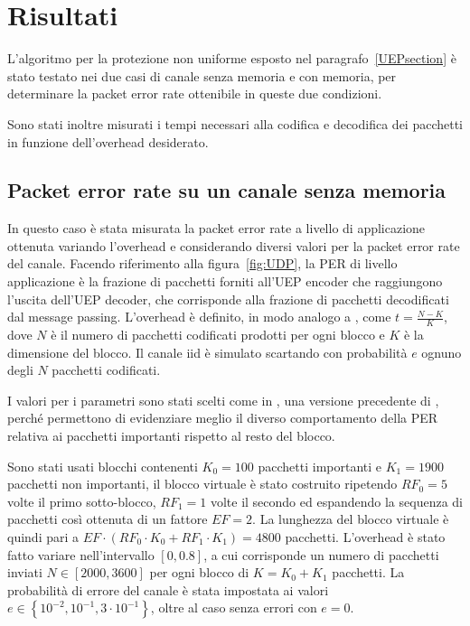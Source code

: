 \documentclass[italian, a4paper, 12pt]{article}
\begin{document}
\section{Risultati} %
\label{sec:results}
L'algoritmo per la protezione non uniforme esposto nel
paragrafo~\ref{UEPsection} è stato testato nei due casi di canale
senza memoria e con memoria, per determinare la packet error
rate ottenibile in queste due condizioni.

Sono stati inoltre misurati i tempi necessari alla codifica e
decodifica dei pacchetti in funzione dell'overhead desiderato.

\subsection{Packet error rate su un canale senza memoria}
\label{sec:iid}
In questo caso è stata misurata la packet error rate a livello di
applicazione ottenuta variando l'overhead e considerando diversi
valori per la packet error rate del canale.
%
Facendo riferimento alla figura~\ref{fig:UDP}, la PER di livello
applicazione è la frazione di pacchetti forniti all'UEP encoder che
raggiungono l'uscita dell'UEP decoder, che corrisponde alla frazione
di pacchetti decodificati dal message passing.
%
L'overhead è definito, in modo analogo a \cite{uep}, come $t =
\frac{N-K}{K}$, dove $N$ è il numero di pacchetti codificati prodotti
per ogni blocco e $K$ è la dimensione del blocco.
%
Il canale iid è simulato scartando con probabilità $e$ ognuno degli
$N$ pacchetti codificati.

I valori per i parametri sono stati scelti come in \cite{uepother},
una versione precedente di \cite{uep}, perché permettono di
evidenziare meglio il diverso comportamento della PER relativa ai
pacchetti importanti rispetto al resto del blocco.

Sono stati usati blocchi contenenti $K_0 = 100$ pacchetti importanti e
$K_1 = 1900$ pacchetti non importanti, il blocco virtuale è stato
costruito ripetendo $RF_0 = 5$ volte il primo sotto-blocco, $RF_1 = 1$
volte il secondo ed espandendo la sequenza di pacchetti così ottenuta
di un fattore $EF = 2$. La lunghezza del blocco virtuale è quindi pari
a $EF \cdot \left( RF_0 \cdot K_0 + RF_1 \cdot K_1 \right) = 4800$
pacchetti.
%
L'overhead è stato fatto variare nell'intervallo $[0, 0.8]$, a cui
corrisponde un numero di pacchetti inviati $N \in [2000, 3600]$ per
ogni blocco di $K=K_0+K_1$ pacchetti.
%
La probabilità di errore del canale è stata impostata ai valori $e \in
\left\{10^{-2}, 10^{-1}, 3 \cdot 10^{-1} \right\}$, oltre al caso
senza errori con $e=0$.
\end{document}
